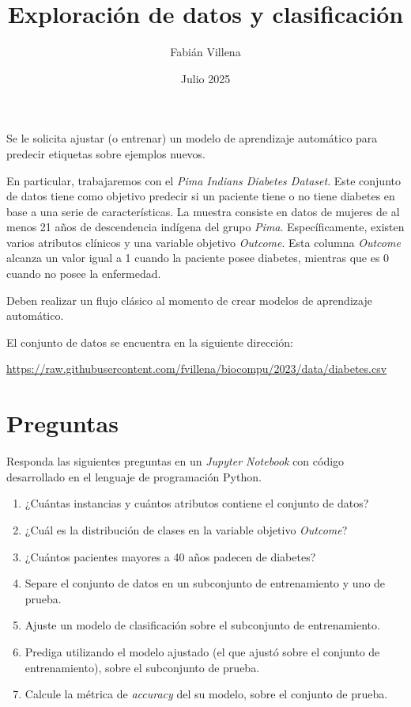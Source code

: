 \documentclass{article}
\title{Exploración de datos y clasificación}
\author{Fabián Villena}
\date{Julio 2025}
\begin{document}
\maketitle

Se le solicita ajustar (o entrenar) un modelo de aprendizaje automático para predecir etiquetas sobre ejemplos nuevos.

En particular, trabajaremos con el \textit{Pima Indians Diabetes Dataset}. Este conjunto de datos tiene como objetivo predecir si un paciente tiene o no tiene diabetes en base a una serie de características. La muestra consiste en datos de mujeres de al menos 21 años de descendencia indígena del grupo \textit{Pima}. Específicamente, existen varios atributos clínicos y una variable objetivo \textit{Outcome}. Esta columna \textit{Outcome} alcanza un valor igual a 1 cuando la paciente posee  diabetes, mientras que es 0 cuando no posee la enfermedad.

Deben realizar un flujo clásico al momento de crear modelos de aprendizaje automático.

El conjunto de datos se encuentra en la siguiente dirección:

\begin{center}
    \url{https://raw.githubusercontent.com/fvillena/biocompu/2023/data/diabetes.csv}
\end{center}

\section*{Preguntas}

Responda las siguientes preguntas en un \textit{Jupyter Notebook} con código desarrollado en el lenguaje de programación Python.

\begin{enumerate}
    \item ¿Cuántas instancias y cuántos atributos contiene el conjunto de datos?
    \item ¿Cuál es la distribución de clases en la variable objetivo \textit{Outcome}?
    \item ¿Cuántos pacientes mayores a 40 años padecen de diabetes?
    \item Separe el conjunto de datos en un subconjunto de entrenamiento y uno de prueba.
    \item Ajuste un modelo de clasificación sobre el subconjunto de entrenamiento.
    \item Prediga utilizando el modelo ajustado (el que ajustó sobre el conjunto de entrenamiento), sobre el subconjunto de prueba.
    \item Calcule la métrica de \textit{accuracy} del su modelo, sobre el conjunto de prueba.
\end{enumerate}
\end{document}
